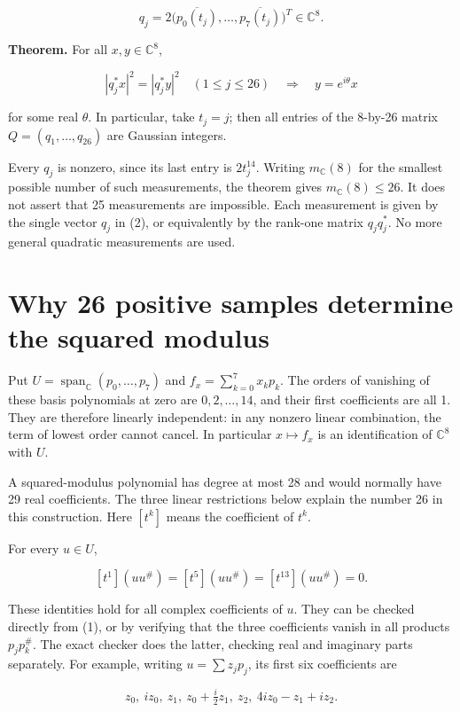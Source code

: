 \[
q_j=2\bigl(\overline{p_0(t_j)},\ldots,\overline{p_7(t_j)}\bigr)^T
\in\mathbb C^8. \tag{2}
\]

\textbf{Theorem.} For all \(x,y\in\mathbb C^8\),

\[
|q_j^*x|^2=|q_j^*y|^2\quad(1\le j\le26)
\quad\Longrightarrow\quad y=e^{i\theta}x
\]

for some real \(\theta\). In particular, take \(t_j=j\); then all
entries of the 8-by-26 matrix \(Q=(q_1,\ldots,q_{26})\) are Gaussian
integers.

Every \(q_j\) is nonzero, since its last entry is \(2t_j^{14}\). Writing
\(m_{\mathbb C}(8)\) for the smallest possible number of such
measurements, the theorem gives \(m_{\mathbb C}(8)\le26\). It does not
assert that 25 measurements are impossible. Each measurement is given by
the single vector \(q_j\) in (2), or equivalently by the rank-one matrix
\(q_jq_j^*\). No more general quadratic measurements are used.

\section{Why 26 positive samples determine the squared
modulus}\label{why-26-positive-samples-determine-the-squared-modulus}

Put \(U=\operatorname{span}_{\mathbb C}(p_0,\ldots,p_7)\) and
\(f_x=\sum_{k=0}^7x_kp_k\). The orders of vanishing of these basis
polynomials at zero are \(0,2,\ldots,14\), and their first coefficients
are all 1. They are therefore linearly independent: in any nonzero
linear combination, the term of lowest order cannot cancel. In
particular \(x\mapsto f_x\) is an identification of \(\mathbb C^8\) with
\(U\).

A squared-modulus polynomial has degree at most 28 and would normally
have 29 real coefficients. The three linear restrictions below explain
the number 26 in this construction. Here \([t^k]\) means the coefficient
of \(t^k\).

For every \(u\in U\),

\[
[t^1](uu^\#)=[t^5](uu^\#)=[t^{13}](uu^\#)=0. \tag{3}
\]

These identities hold for all complex coefficients of \(u\). They can be
checked directly from (1), or by verifying that the three coefficients
vanish in all products \(p_jp_k^\#\). The exact checker does the latter,
checking real and imaginary parts separately. For example, writing
\(u=\sum z_jp_j\), its first six coefficients are

\[
z_0,\ iz_0,\ z_1,\ z_0+\tfrac i2z_1,\ z_2,
\ 4iz_0-z_1+iz_2.
\]

